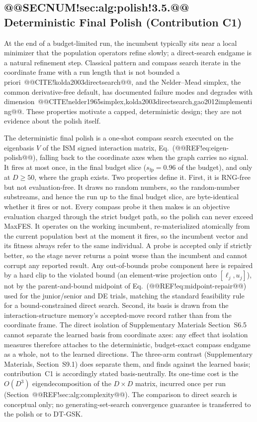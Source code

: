 \documentclass[10pt,a4paper]{article}
\newcommand{\dtgsk}{DT-GSK}
\begin{document}
\subsection{@@SECNUM!sec:alg:polish!3.5.@@ Deterministic Final Polish (Contribution C1)}\label{sec:alg:polish}


At the end of a budget-limited run, the incumbent typically sits near
a local minimizer that the population operators refine slowly; a
direct-search endgame is a natural refinement step.
Classical pattern and compass search iterate in the coordinate frame
with a run length that is not bounded a
priori~@@CITE!kolda2003directsearch@@, and the Nelder--Mead simplex, the
common derivative-free default, has documented failure modes and
degrades with
dimension~@@CITE!nelder1965simplex,kolda2003directsearch,gao2012implementing@@.
These properties motivate a capped, deterministic design; they are not
evidence about the polish itself.

The deterministic final polish is a one-shot compass search
executed on the eigenbasis $V$ of the ISM signed interaction matrix,
Eq.~(@@REF!eq:eigen-polish@@), falling back to the coordinate axes when
the graph carries no signal.
It fires at most once, in the final budget slice
($s_{\text{fp}}=0.96$ of the budget), and only at $D\ge50$,
where the graph exists. 
Two properties define it.
First, it is RNG-free but not evaluation-free. It draws no random
numbers, so the random-number substreams, and hence the run up to
the final budget slice, are byte-identical whether it fires or not.
Every compass probe it then makes is an objective evaluation charged
through the strict budget path, so the polish can never exceed
MaxFES. 
It operates on the working incumbent, re-materialized atomically from the current
population best at the moment it fires, so the incumbent vector and its fitness
always refer to the same individual. A probe is accepted only if strictly
better, so the stage never returns a
point worse than the incumbent and cannot corrupt any reported result. Any out-of-bounds probe component here is repaired by a hard clip to the violated bound (an element-wise projection onto $[\ell_j,u_j]$), not by the parent-and-bound midpoint of Eq.~(@@REF!eq:midpoint-repair@@) used for the junior/senior and DE trials, matching the standard feasibility rule for a bound-constrained direct search.
Second, its basis is drawn from the interaction-structure memory's accepted-move
record rather than from the coordinate frame. The direct isolation of
Supplementary Materials Section~S6.5 cannot separate the learned basis from
coordinate axes: any effect that isolation measures therefore attaches to the
deterministic, budget-exact compass endgame as a whole, not to the learned
directions. The three-arm contrast (Supplementary
Materials, Section~S9.1) does separate them, and finds against the learned
basis; contribution~C1 is accordingly stated basis-neutrally.
Its one-time cost is the $O(D^{3})$ eigendecomposition of the
$D\times D$ matrix, incurred once per run
(Section~@@REF!sec:alg:complexity@@). 
The comparison to direct search is conceptual only; no
generating-set-search convergence guarantee is transferred to the
polish or to \dtgsk{}.
\end{document}
